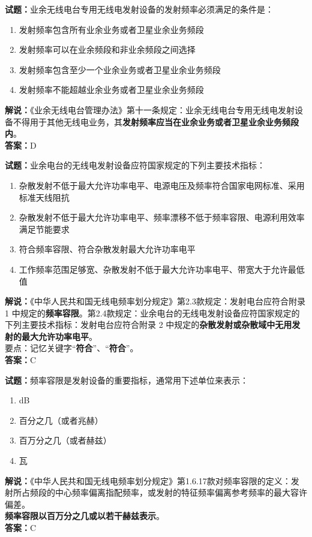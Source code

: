\documentclass{ctexbook}
\begin{document}
\vspace{\baselineskip}

\noindent\textbf{试题：}业余无线电台专用无线电发射设备的发射频率必须满足的条件是：
\begin{enumerate}[leftmargin=3em]
  \item 发射频率包含所有业余业务或者卫星业余业务频段
  \item 发射频率可以在业余频段和非业余频段之间选择
  \item 发射频率包含至少一个业余业务或者卫星业余业务频段
  \item 发射频率不能超越业余业务或者卫星业余业务频段
\end{enumerate}
\noindent\textbf{解说：}《业余无线电台管理办法》第十一条规定：业余无线电台专用无线电发射设备不得用于其他无线电业务，其\textbf{发射频率应当在业余业务或者卫星业余业务频段内}。\\\noindent\textbf{答案：}D

\vspace{\baselineskip}

\noindent\textbf{试题：}业余电台的无线电发射设备应符国家规定的下列主要技术指标：
\begin{enumerate}[leftmargin=3em]
  \item 杂散发射不低于最大允许功率电平、电源电压及频率符合国家电网标准、采用标准天线阻抗
  \item 杂散发射不低于最大允许功率电平、频率漂移不低于频率容限、电源利用效率满足节能要求
  \item 符合频率容限、符合杂散发射最大允许功率电平
  \item 工作频率范围足够宽、杂散发射不低于最大允许功率电平、带宽大于允许最低值
\end{enumerate}
\noindent\textbf{解说：}《中华人民共和国无线电频率划分规定》第2.3款规定：发射电台应符合附录 1 中规定的\textbf{频率容限}。第2.4款规定：业余电台的无线电发射设备应符国家规定的下列主要技术指标：发射电台应符合附录 2 中规定的\textbf{杂散发射或杂散域中无用发射的最大允许功率电平}。\\要点：记忆关键字“\textbf{符合}”、“\textbf{符合}”。\\\noindent\textbf{答案：}C

\vspace{\baselineskip}

\noindent\textbf{试题：}频率容限是发射设备的重要指标，通常用下述单位来表示：
\begin{enumerate}[leftmargin=3em]
  \item dB
  \item 百分之几（或者兆赫）
  \item 百万分之几（或者赫兹）
  \item 瓦
\end{enumerate}
\noindent\textbf{解说：}《中华人民共和国无线电频率划分规定》第1.6.17款对频率容限的定义：发射所占频段的中心频率偏离指配频率，或发射的特征频率偏离参考频率的最大容许偏差。\\\textbf{频率容限以百万分之几或以若干赫兹表示}。\\\noindent\textbf{答案：}C
\end{document}
